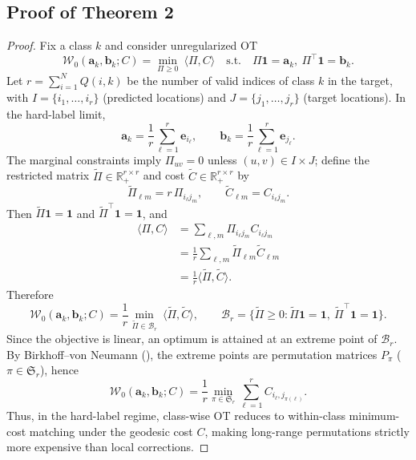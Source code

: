 \documentclass[numsec,webpdf,contemporary,large]{oup-authoring-template}%
\theoremstyle{thmstyleone}%
\theoremstyle{thmstyletwo}%
\theoremstyle{thmstylethree}%
\begin{document}
\subsection{Proof of Theorem 2}
\label{proof:theorem_2}
\begin{proof}
Fix a class $k$ and consider unregularized OT
\begin{equation}
\mathcal{W}_{0}(\mathbf{a}_k,\mathbf{b}_k;C)
=
\min_{\Pi\ge 0}\ \langle \Pi, C\rangle
\quad
\text{s.t.}\quad
\Pi\mathbf{1}=\mathbf{a}_k,\ \Pi^\top\mathbf{1}=\mathbf{b}_k .
\label{eq:w0_def_em}
\end{equation}
Let $r=\sum_{i=1}^{N}Q(i,k)$ be the number of valid indices of class $k$ in the target, with $I=\{i_1,\ldots,i_r\}$ (predicted locations) and $J=\{j_1,\ldots,j_r\}$ (target locations). In the hard-label limit,
\begin{equation}
\mathbf{a}_k=\frac{1}{r}\sum_{\ell=1}^{r}\mathbf{e}_{i_\ell},
\qquad
\mathbf{b}_k=\frac{1}{r}\sum_{\ell=1}^{r}\mathbf{e}_{j_\ell}.
\label{eq:hard_masses_em}
\end{equation}
The marginal constraints imply $\Pi_{uv}=0$ unless $(u,v)\in I\times J$; define the restricted matrix $\widetilde{\Pi}\in\mathbb{R}_+^{r\times r}$ and cost $\widetilde{C}\in\mathbb{R}_+^{r\times r}$ by
\begin{equation}
\widetilde{\Pi}_{\ell m}=r\,\Pi_{i_\ell j_m},
\qquad
\widetilde{C}_{\ell m}=C_{i_\ell j_m}.
\label{eq:restrict_em}
\end{equation}
Then $\widetilde{\Pi}\mathbf{1}=\mathbf{1}$ and $\widetilde{\Pi}^\top\mathbf{1}=\mathbf{1}$, and
\begin{align}
\langle \Pi, C\rangle
&=
\sum_{\ell,m}\Pi_{i_\ell j_m}C_{i_\ell j_m} \\
&=
\frac{1}{r}\sum_{\ell,m}\widetilde{\Pi}_{\ell m}\widetilde{C}_{\ell m} \\
&=
\frac{1}{r}\langle \widetilde{\Pi},\widetilde{C}\rangle.
\label{eq:obj_reduce_em}
\end{align}
Therefore
\begin{equation}
\mathcal{W}_{0}(\mathbf{a}_k,\mathbf{b}_k;C)
=
\frac{1}{r}\min_{\widetilde{\Pi}\in\mathcal{B}_r}\ \langle \widetilde{\Pi},\widetilde{C}\rangle,
\qquad
\mathcal{B}_r=\{\widetilde{\Pi}\ge 0:\widetilde{\Pi}\mathbf{1}=\mathbf{1},\ \widetilde{\Pi}^\top\mathbf{1}=\mathbf{1}\}.
\label{eq:birkhoff_em}
\end{equation}
Since the objective is linear, an optimum is attained at an extreme point of $\mathcal{B}_r$. By Birkhoff--von Neumann (\citealt{von1953certain}), the extreme points are permutation matrices $P_\pi$ ($\pi\in\mathfrak{S}_r$), hence
\begin{equation}
\mathcal{W}_{0}(\mathbf{a}_k,\mathbf{b}_k;C)
=
\frac{1}{r}\min_{\pi\in\mathfrak{S}_r}\sum_{\ell=1}^{r} C_{i_\ell, j_{\pi(\ell)}}.
\label{eq:assignment_em}
\end{equation}
Thus, in the hard-label regime, class-wise OT reduces to within-class minimum-cost matching under the geodesic cost $C$, making long-range permutations strictly more expensive than local corrections.
\end{proof}
\end{document}
